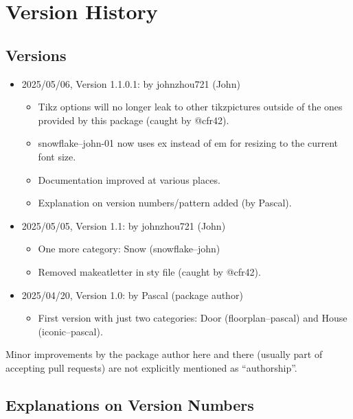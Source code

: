 \documentclass{article}
\begin{document}
\section*{Version History}

\subsection*{Versions}

\begin{itemize}
  \setlength{\parskip}{3pt}
  \item 2025/05/06, Version 1.1.0.1: \hfill by johnzhou721 (John)
  \begin{itemize}
      \item Tikz options will no longer leak to other tikzpictures outside of the ones provided by this package (caught by @cfr42).
      \item snowflake--john-01 now uses ex instead of em for resizing to the current font size.
      \item Documentation improved at various places.
      \item Explanation on version numbers/pattern added (by Pascal).
  \end{itemize}
  \item 2025/05/05, Version 1.1: \hfill by johnzhou721 (John)
  \begin{itemize}
      \item One more category: Snow (snowflake--john)
      \item Removed makeatletter in sty file (caught by @cfr42).
  \end{itemize}
  \item 2025/04/20, Version 1.0: \hfill by Pascal (package author)
  \begin{itemize}
      \item First version with just two categories: Door (floorplan--pascal) and House (iconic--pascal).
  \end{itemize}
\end{itemize}

Minor improvements by the package author here and there (usually part of accepting pull requests) are not explicitly mentioned as ``authorship''.

\subsection*{Explanations on Version Numbers}
\end{document}
